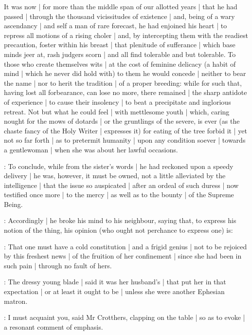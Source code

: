 It was now |
for more than the middle span of our allotted years |
that he had passed |
through the thousand vicissitudes of existence |
and,
being of a wary ascendancy |
and self a man of rare forecast,
he had enjoined his heart |
to repress all motions of a rising choler |
and,
by intercepting them with the readiest precaution,
foster within his breast |
that plenitude of sufferance |
which base minds jeer at,
rash judgers scorn |
and all find tolerable and but tolerable.
To those who create themselves wits |
at the cost of feminine delicacy
(a habit of mind |
which he never did hold with)
to them he would concede |
neither to bear the name |
nor to herit the tradition |
of a proper breeding:
while for such that,
having lost all forbearance,
can lose no more,
there remained |
the sharp antidote of experience |
to cause their insolency |
to beat a precipitate and inglorious retreat.
Not but what he could feel |
with mettlesome youth |
which,
caring nought for the mows of dotards |
or the gruntlings of the severe,
is ever
(as the chaste fancy of the Holy Writer |
expresses it)
for eating of the tree forbid it |
yet not so far forth |
as to pretermit humanity |
upon any condition soever |
towards a gentlewoman |
when she was about her lawful occasions.

:
To conclude,
while from the sister's words |
he had reckoned upon a speedy delivery |
he was,
however,
it must be owned,
not a little alleviated by the intelligence |
that the issue so auspicated |
after an ordeal of such duress |
now testified once more |
to the mercy |
as well as to the bounty |
of the Supreme Being.



:
Accordingly |
he broke his mind to his neighbour,
saying that,
to express his notion of the thing,
his opinion
(who ought not perchance to express one)
is:

\Bloom:
That one must have a cold constitution |
and a frigid genius |
not to be rejoiced by this freshest news |
of the fruition of her confinement |
since she had been in such pain |
through no fault of hers.

:
The dressy young blade |
said it was her husband's |
that put her in that expectation |
or at least it ought to be |
unless she were another Ephesian matron.

:
I must acquaint you,
said Mr Crotthers,
clapping on the table |
so as to evoke |
a resonant comment of emphasis.


